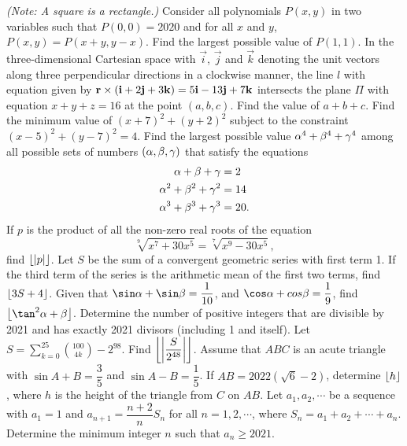 \begin{enumerate}
    \textit{(Note: A square is a rectangle.)}
    \hyperrefitem[A::2021-O-1-6] Consider all polynomials $P(x, y)$ in two variables such that $P(0, 0) = 2020$ and for all $x$ and $y$, $P(x, y) = P(x + y, y - x)$. Find the largest possible value of $P(1, 1)$.
    \hyperrefitem[A::2021-O-1-7] In the three-dimensional Cartesian space with $\vec i$, $\vec j$ and $\vec k$ denoting the unit vectors along three perpendicular directions in a clockwise manner, the line $l$ with equation given by $\mathbf{r} \times (\mathbf{i} + 2 \mathbf{j} + 3 \mathbf{k}) = 5\mathbf{i} - 13\mathbf{j} + 7\mathbf{k}$ intersects the plane $\Pi$ with equation $x + y + z = 16$ at the point $(a, b, c)$. Find the value of $a + b + c$.
    \hyperrefitem[A::2021-O-1-8] Find the minimum value of $(x + 7)^2 + (y + 2)^2$ subject to the constraint $(x-5)^2 + (y-7)^2 = 4$.
    \hyperrefitem[A::2021-O-1-9] Find the largest possible value $\alpha^4 + \beta^4 + \gamma^4$ among all possible sets of numbers $(\alpha, \beta, \gamma)$ that satisfy the equations
    \[\begin{aligned}
        \alpha + \beta + \gamma &= 2\\
        \alpha^2 + \beta^2 + \gamma^2 &= 14\\
        \alpha^3 + \beta^3 + \gamma^3 &= 20.
    \end{aligned}\]
    \hyperrefitem[A::2021-O-1-10] If $p$ is the product of all the non-zero real roots of the equation \[\sqrt[9]{x^7 + 30x^5} = \sqrt[7]{x^9 - 30x^5},\] find $\left\lfloor \left\lvert p \right\rvert \right\rfloor$.
    \hyperrefitem[A::2021-O-1-11] Let $S$ be the sum of a convergent geometric series with first term 1. If the third term of the series is the arithmetic mean of the first two terms, find $\left\lfloor 3S + 4 \right\rfloor$.
    \hyperrefitem[A::2021-O-1-12] Given that $\sin \a + \sin \b = \dfrac1{10}$, and $\cos \a + cos \b = \dfrac19$, find $\floor{\tan^2{\a + \b}}$.
    \hyperrefitem[A::2021-O-1-13] Determine the number of positive integers that are divisible by 2021 and has exactly 2021 divisors (including 1 and itself).
    \hyperrefitem[A::2021-O-1-14] Let $S = \displaystyle\sum_{k=0}^{25} \binom{100}{4k} - 2^{98}$. Find $\left\lfloor \left\lvert \dfrac{S}{2^{48}} \right\rvert \right\rfloor$.
    \hyperrefitem[A::2021-O-1-15] Assume that $ABC$ is an acute triangle with $\sin{A + B} = \dfrac35$ and $\sin{A-B} = \dfrac15$. If $AB = 2022(\sqrt6 - 2)$, determine $\left\lfloor h \right\rfloor$, where $h$ is the height of the triangle from $C$ on $AB$.
    \hyperrefitem[A::2021-O-1-16] Let $a_1, a_2, \cdots$ be a sequence with $a_1 = 1$ and $a_{n+1} = \dfrac{n+2}{n} S_n$ for all $n = 1, 2, \cdots$, where $S_n = a_1 + a_2 + \cdots + a_n$. Determine the minimum integer $n$ such that $a_n \geq 2021$.

\end{enumerate}
